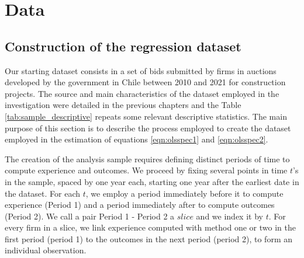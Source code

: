 \section{Data}
\subsection{Construction of the regression dataset}

\label{section:main_data}
Our starting dataset consists in a set of bids submitted by firms in auctions developed by the government in Chile between 2010 and 2021 for construction projects. The source and main characteristics of the dataset employed in the investigation were detailed in the previous chapters and the Table \ref{tab:sample_descriptive} repeats some relevant descriptive statistics. The main purpose of this section is to describe the process employed to create the dataset employed in the estimation of equations \ref{eqn:olsspec1} and \ref{eqn:olsspec2}.



The creation of the analysis sample requires defining distinct periods of time to compute experience and outcomes. We proceed by fixing several points in time $t$'s in the sample, spaced by one year each, starting one year after the earliest date in the dataset. For each $t$, we employ a period immediately before it to compute experience (Period 1) and a period immediately after to compute outcomes (Period 2). We call a pair Period 1 - Period 2 a $slice$ and we index it by $t$. For every firm in a slice, we link experience computed with method one or two  in the first period (period 1) to the outcomes in the next period (period 2), to form an individual observation.

